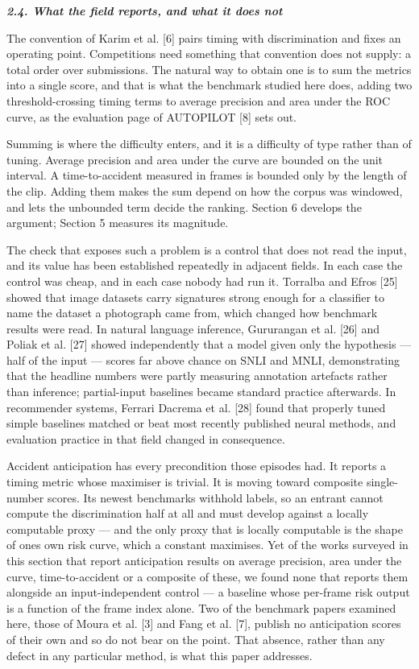 \emph{\textbf{2.4. What the field reports, and what it does not}}

The convention of Karim et al. {[}6{]} pairs timing with discrimination and fixes an operating point. Competitions need something that convention does not supply: a total order over submissions. The natural way to obtain one is to sum the metrics into a single score, and that is what the benchmark studied here does, adding two threshold-crossing timing terms to average precision and area under the ROC curve, as the evaluation page of AUTOPILOT {[}8{]} sets out.

Summing is where the difficulty enters, and it is a difficulty of type rather than of tuning. Average precision and area under the curve are bounded on the unit interval. A time-to-accident measured in frames is bounded only by the length of the clip. Adding them makes the sum depend on how the corpus was windowed, and lets the unbounded term decide the ranking. Section 6 develops the argument; Section 5 measures its magnitude.

The check that exposes such a problem is a control that does not read the input, and its value has been established repeatedly in adjacent fields. In each case the control was cheap, and in each case nobody had run it. Torralba and Efros {[}25{]} showed that image datasets carry signatures strong enough for a classifier to name the dataset a photograph came from, which changed how benchmark results were read. In natural language inference, Gururangan et al. {[}26{]} and Poliak et al. {[}27{]} showed independently that a model given only the hypothesis --- half of the input --- scores far above chance on SNLI and MNLI, demonstrating that the headline numbers were partly measuring annotation artefacts rather than inference; partial-input baselines became standard practice afterwards. In recommender systems, Ferrari Dacrema et al. {[}28{]} found that properly tuned simple baselines matched or beat most recently published neural methods, and evaluation practice in that field changed in consequence.

Accident anticipation has every precondition those episodes had. It reports a timing metric whose maximiser is trivial. It is moving toward composite single-number scores. Its newest benchmarks withhold labels, so an entrant cannot compute the discrimination half at all and must develop against a locally computable proxy --- and the only proxy that is locally computable is the shape of one\textquotesingle s own risk curve, which a constant maximises. Yet of the works surveyed in this section that report anticipation results on average precision, area under the curve, time-to-accident or a composite of these, we found none that reports them alongside an input-independent control --- a baseline whose per-frame risk output is a function of the frame index alone. Two of the benchmark papers examined here, those of Moura et al. {[}3{]} and Fang et al. {[}7{]}, publish no anticipation scores of their own and so do not bear on the point. That absence, rather than any defect in any particular method, is what this paper addresses.

